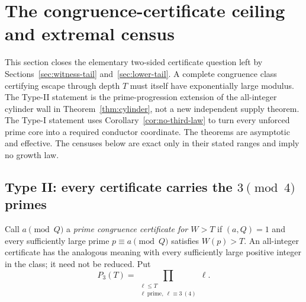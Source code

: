 \documentclass[10pt,reqno]{amsart}
\theoremstyle{definition}
\newcommand{\1}{\mathbf 1}
\begin{document}
\section{The congruence-certificate ceiling and extremal census}
\label{sec:certificate-ceiling}
This section closes the elementary two-sided certificate question left by
Sections~\ref{sec:witness-tail} and~\ref{sec:lower-tail}.  A complete
congruence class certifying escape through depth $T$ must itself have
exponentially large modulus.  The Type-II statement is the prime-progression
extension of the all-integer cylinder wall in
Theorem~\ref{thm:cylinder}, not a new independent supply theorem.  The
Type-I statement uses Corollary~\ref{cor:no-third-law} to turn every
unforced prime core into a required conductor coordinate.  The theorems are
asymptotic and effective.  The censuses below are exact only in their stated
ranges and imply no growth law.

\subsection{Type II: every certificate carries the $3\pmod4$ primes}
Call $a\pmod Q$ a \emph{prime congruence certificate for $W>T$} if
$(a,Q)=1$ and every sufficiently large prime $p\equiv a\pmod Q$ satisfies
$W(p)>T$.  An all-integer certificate has the analogous meaning with every
sufficiently large positive integer in the class; it need not be reduced.
Put
\begin{equation}\tag{56.1}
 P_3(T)=\prod_{\substack{\ell\leq T\\
                 \ell\ \mathrm{prime},\ \ell\equiv3\ (4)}}\ell.
\end{equation}
\end{document}
